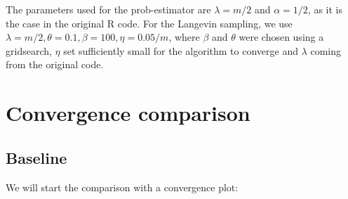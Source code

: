 \documentclass[12pt]{memoir}
\begin{document}
The parameters used for the prob-estimator are $\lambda=m/2$ and $\alpha=1/2$, as it is the case in the original R code. For the Langevin sampling, we use $\lambda=m/2,\theta=0.1,\beta=100,\eta=0.05/m$, where $\beta$ and $\theta$ were chosen using a gridsearch, $\eta$ set sufficiently small for the algorithm to converge and $\lambda$ coming from the original code.

\section{Convergence comparison}\label{section:convergence-comparison}

\subsection*{Baseline}

We will start the comparison with a convergence plot:
\end{document}
